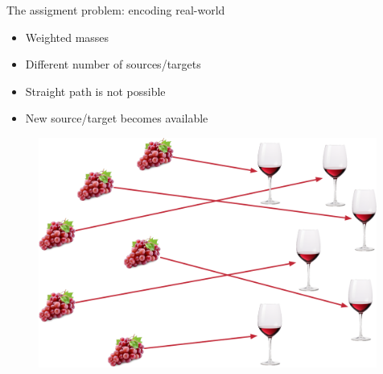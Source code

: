\documentclass[pdf,aspectratio=169,10pt]{beamer}
\begin{document}
\begin{frame}{The assigment problem: encoding real-world}

\begin{minipage}{0.45\textwidth}
\begin{itemize}
    \item Weighted masses
    \item Different number of sources/targets
    \item Straight path is not possible
    \item New source/target becomes available
\end{itemize}
\end{minipage}
\hfill
\begin{minipage}{0.5\textwidth}
 \begin{figure}
        \includegraphics[width=0.99\textwidth]{../img/wine_assignment.pdf}  
    \end{figure}
\end{minipage}

\end{frame}
\end{document}
